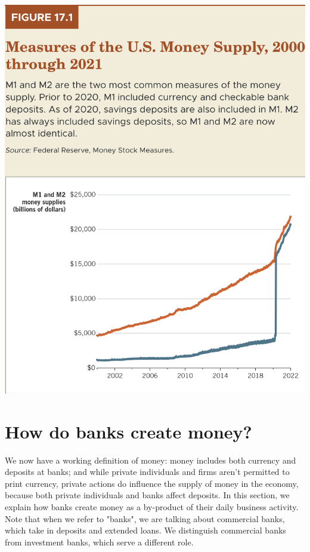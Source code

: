 \documentclass[11pt]{article} %
\begin{document}
\begin{center}
\includegraphics[scale=0.5]{../../Chapter 17 Money and the Federal Reserve/Notes/images/Figure 17.1.png} 
\end{center}

\section*{How do banks create money?}
We now have a working definition of money: money includes both currency and deposits at banks; and while private individuals and firms aren't permitted to print currency, private actions do influence the supply of money in the economy, because both private individuals and banks affect deposits. In this section, we explain how banks create money as a by-product of their daily business activity. Note that when we refer to "banks", we are talking about commercial banks, which take in deposits and extended loans. We distinguish commercial banks from investment banks, which serve a different role.
\end{document}
